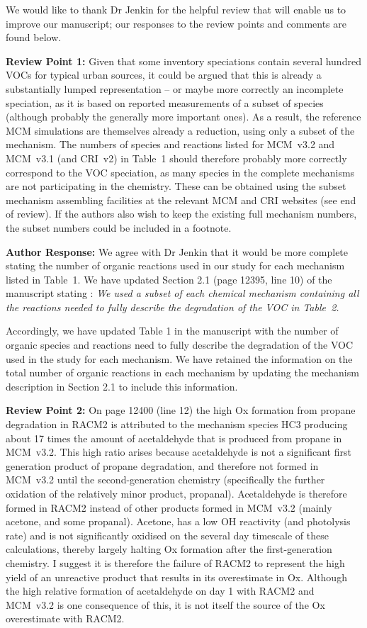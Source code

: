 \documentclass{article}
\begin{document}
We would like to thank Dr Jenkin for the helpful review that will enable us to improve our manuscript; our responses to the review points and comments are found below.

\textbf{Review Point 1:} Given that some inventory speciations contain several hundred VOCs for typical urban sources, it could be argued that this is already a substantially lumped representation – or maybe more correctly an incomplete speciation, as it is based on reported measurements of a subset of species (although probably the generally more important ones). As a result, the reference MCM simulations are themselves already a reduction, using only a subset of the mechanism. The numbers of species and reactions listed for MCM~v3.2 and MCM~v3.1 (and CRI~v2) in Table~1 should therefore probably more correctly correspond to the VOC speciation, as many species in the complete mechanisms are not participating in the chemistry. These can be obtained using the subset mechanism assembling facilities at the relevant MCM and CRI websites (see end of review). If the authors also wish to keep the existing full mechanism numbers, the subset numbers could be included in a footnote.

\textbf{Author Response:} We agree with Dr Jenkin that it would be more complete stating the number of organic reactions used in our study for each mechanism listed in Table~1. 
We have updated Section 2.1 (page 12395, line 10) of the manuscript stating :
\textit{We used a subset of each chemical mechanism containing all the reactions needed to fully describe the degradation of the VOC in Table~2.  }

Accordingly, we have updated Table 1 in the manuscript with the number of organic species and reactions need to fully describe the degradation of the VOC used in the study for each mechanism. 
We have retained the information on the total number of organic reactions in each mechanism by updating the mechanism description in Section 2.1 to include this information.

\textbf{Review Point 2:} On page 12400 (line 12) the high Ox formation from propane degradation in RACM2 is attributed to the mechanism species HC3 producing about 17 times the amount of acetaldehyde that is produced from propane in MCM~v3.2. This high ratio arises because acetaldehyde is not a significant first generation product of propane degradation, and therefore not formed in MCM~v3.2 until the second-generation chemistry (specifically the further oxidation of the relatively minor product, propanal). Acetaldehyde is therefore formed in RACM2 instead of other products formed in MCM~v3.2 (mainly acetone, and some propanal). Acetone, has a low OH reactivity (and photolysis rate) and is not significantly oxidised on the several day timescale of these calculations, thereby largely halting Ox formation after the first-generation chemistry. I suggest it is therefore the failure of RACM2 to represent the high yield of an unreactive product that results in its overestimate in Ox. Although the high relative formation of acetaldehyde on day 1 with RACM2 and MCM~v3.2 is one consequence of this, it is not itself the source of the Ox overestimate with RACM2.
\end{document}
